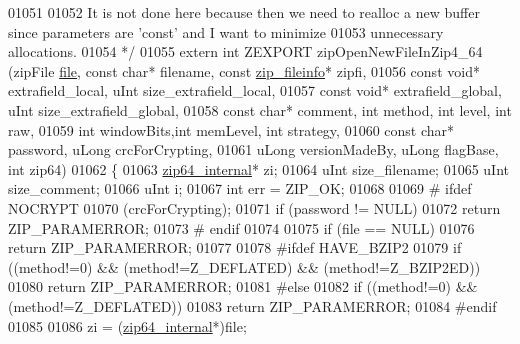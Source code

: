 \begin{DoxyCode}
01051 \textcolor{comment}{}
01052 \textcolor{comment}{ It is not done here because then we need to realloc a new buffer since parameters are 'const' and I want
       to minimize}
01053 \textcolor{comment}{ unnecessary allocations.}
01054 \textcolor{comment}{ */}
01055 \textcolor{keyword}{extern} \textcolor{keywordtype}{int} ZEXPORT zipOpenNewFileInZip4\_64 (zipFile \hyperlink{structfile}{file}, \textcolor{keyword}{const} \textcolor{keywordtype}{char}* filename, \textcolor{keyword}{const} 
      \hyperlink{structzip__fileinfo}{zip\_fileinfo}* zipfi,
01056                                          \textcolor{keyword}{const} \textcolor{keywordtype}{void}* extrafield\_local, uInt size\_extrafield\_local,
01057                                          \textcolor{keyword}{const} \textcolor{keywordtype}{void}* extrafield\_global, uInt size\_extrafield\_global,
01058                                          \textcolor{keyword}{const} \textcolor{keywordtype}{char}* comment, \textcolor{keywordtype}{int} method, \textcolor{keywordtype}{int} level, \textcolor{keywordtype}{int} raw,
01059                                          \textcolor{keywordtype}{int} windowBits,\textcolor{keywordtype}{int} memLevel, \textcolor{keywordtype}{int} strategy,
01060                                          \textcolor{keyword}{const} \textcolor{keywordtype}{char}* password, uLong crcForCrypting,
01061                                          uLong versionMadeBy, uLong flagBase, \textcolor{keywordtype}{int} zip64)
01062 \{
01063     \hyperlink{structzip64__internal}{zip64\_internal}* zi;
01064     uInt size\_filename;
01065     uInt size\_comment;
01066     uInt i;
01067     \textcolor{keywordtype}{int} err = ZIP\_OK;
01068 
01069 \textcolor{preprocessor}{#    ifdef NOCRYPT}
01070     (crcForCrypting);
01071     \textcolor{keywordflow}{if} (password != NULL)
01072         \textcolor{keywordflow}{return} ZIP\_PARAMERROR;
01073 \textcolor{preprocessor}{#    endif}
01074 
01075     \textcolor{keywordflow}{if} (file == NULL)
01076         \textcolor{keywordflow}{return} ZIP\_PARAMERROR;
01077 
01078 \textcolor{preprocessor}{#ifdef HAVE\_BZIP2}
01079     \textcolor{keywordflow}{if} ((method!=0) && (method!=Z\_DEFLATED) && (method!=Z\_BZIP2ED))
01080       \textcolor{keywordflow}{return} ZIP\_PARAMERROR;
01081 \textcolor{preprocessor}{#else}
01082     \textcolor{keywordflow}{if} ((method!=0) && (method!=Z\_DEFLATED))
01083       \textcolor{keywordflow}{return} ZIP\_PARAMERROR;
01084 \textcolor{preprocessor}{#endif}
01085 
01086     zi = (\hyperlink{structzip64__internal}{zip64\_internal}*)file;

\end{DoxyCode}
